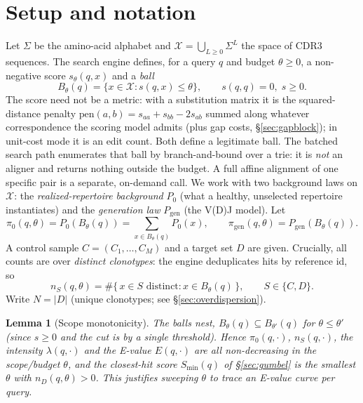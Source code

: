 \documentclass[11pt]{article}
\theoremstyle{oldplain}
\newtheorem{lemma}{Lemma}
\theoremstyle{oldrem}
\newcommand{\Pgen}{P_{\mathrm{gen}}}
\newcommand{\Pzero}{P_{0}}
\newcommand{\ball}[2]{B_{#1}(#2)}
\begin{document}
\section{Setup and notation}\label{sec:setup}

Let $\Sigma$ be the amino-acid alphabet and $\mathcal{X} = \bigcup_{L\ge 0}\Sigma^L$ the space of
CDR3 sequences. The search engine defines, for a query $q$ and budget $\theta\ge 0$, a non-negative
score $s_\theta(q,x)$ and a \emph{ball}
\begin{equation}\label{eq:ball}
  \ball{\theta}{q} = \{x \in \mathcal{X} : s(q,x) \le \theta\}, \qquad s(q,q)=0,\; s\ge 0.
\end{equation}
The score need not be a metric: with a substitution matrix it is the squared-distance penalty
$\mathrm{pen}(a,b)=s_{aa}+s_{bb}-2s_{ab}$ summed along whatever correspondence the scoring model
admits (plus gap costs, \S\ref{sec:gapblock}); in unit-cost mode it is an edit count. Both define a
legitimate ball. The batched search path enumerates that ball by branch-and-bound over a trie: it is
\emph{not} an aligner and returns nothing outside the budget. A full affine alignment of one
specific pair is a separate, on-demand call. We work with two background laws
on $\mathcal{X}$: the \emph{realized-repertoire background} $\Pzero$ (what a healthy, unselected
repertoire instantiates) and the \emph{generation law} $\Pgen$ (the V(D)J model). Let
\begin{equation}\label{eq:pi0}
  \pi_0(q,\theta) = \Pzero\!\left(\ball{\theta}{q}\right) = \sum_{x \in \ball{\theta}{q}} \Pzero(x),
  \qquad
  \pi_{\mathrm{gen}}(q,\theta) = \Pgen\!\left(\ball{\theta}{q}\right).
\end{equation}
A control sample $C=(C_1,\dots,C_M)$ and a target set $D$ are given. Crucially, all counts are over
\emph{distinct clonotypes}: the engine deduplicates hits by reference id, so
\begin{equation}
  n_S(q,\theta) = \#\{\,x \in S \text{ distinct} : x \in \ball{\theta}{q}\,\}, \qquad S\in\{C,D\}.
\end{equation}
Write $N=|D|$ (unique clonotypes; see \S\ref{sec:overdispersion}).

\begin{lemma}[Scope monotonicity]\label{lem:monotone}
The balls nest, $\ball{\theta}{q}\subseteq\ball{\theta'}{q}$ for $\theta\le\theta'$ (since $s\ge0$ and
the cut is by a single threshold). Hence $\pi_0(q,\cdot)$, $n_S(q,\cdot)$, the intensity
$\lambda(q,\cdot)$ and the E-value $E(q,\cdot)$ are all non-decreasing in the scope/budget $\theta$,
and the closest-hit score $S_{\min}(q)$ of \S\ref{sec:gumbel} is the smallest $\theta$ with
$n_D(q,\theta)>0$. This justifies sweeping $\theta$ to trace an E-value curve per query.
\end{lemma}
\end{document}
